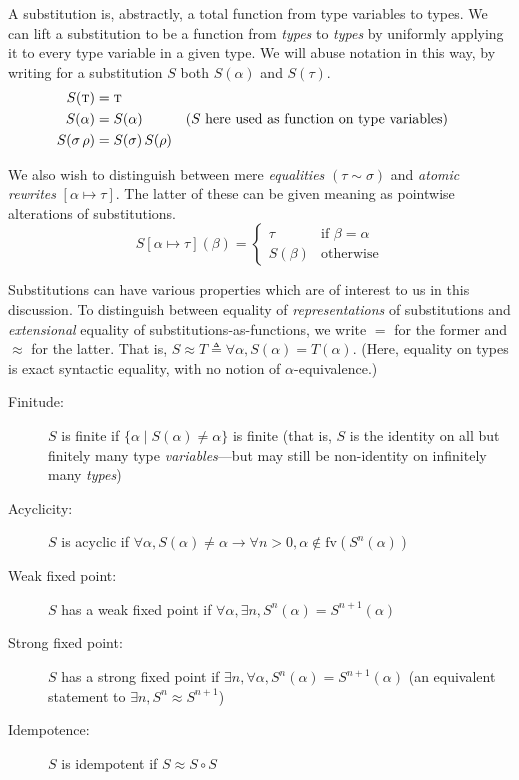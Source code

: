 \documentclass[10pt, letterpaper, oneside]{article}
\newcommand{\fv}{\mathrm{fv}}
\begin{document}
A substitution is, abstractly, a total function from type variables to types. We can lift a substitution to be a function from \emph{types} to \emph{types} by uniformly applying it to every type variable in a given type. We will abuse notation in this way, by writing for a substitution \(S\) both \(S(\alpha)\) and \(S(\tau)\).
\begin{align*}
  S(\text{\sc t}) &= \text{\sc t}\\
  S(\alpha)       &= S(\alpha) && \text{(\(S\) here used as function on type variables)}\\
  S(\sigma\,\rho) &= S(\sigma)\,S(\rho)
\end{align*}

We also wish to distinguish between mere \emph{equalities} \((\tau \sim \sigma)\) and \emph{atomic rewrites} \([\alpha \mapsto \tau]\). The latter of these can be given meaning as pointwise alterations of substitutions.
\begin{equation*}
  S[\alpha \mapsto \tau](\beta) =
  \begin{cases}
    \tau & \text{if } \beta = \alpha\\
    S(\beta) & \text{otherwise}
  \end{cases}
\end{equation*}

Substitutions can have various properties which are of interest to us in this discussion. To distinguish between equality of \emph{representations} of substitutions and \emph{extensional} equality of substitutions-as-functions, we write \(=\) for the former and \(\approx\) for the latter. That is, \(S \approx T \triangleq \forall \alpha, S(\alpha) = T(\alpha)\). (Here, equality on types is exact syntactic equality, with no notion of \(\alpha\)-equivalence.)

\begin{description}
\item[Finitude:] \(S\) is finite if \(\{\alpha \mid S(\alpha) \ne \alpha\}\) is finite (that is, \(S\) is the identity on all but finitely many type \emph{variables}---but may still be non-identity on infinitely many \emph{types})
\item[Acyclicity:] \(S\) is acyclic if \(\forall \alpha, S(\alpha) \ne \alpha \to \forall n > 0, \alpha \notin \fv(S^n(\alpha))\)
\item[Weak fixed point:] \(S\) has a weak fixed point if \(\forall \alpha, \exists n, S^n(\alpha) = S^{n + 1}(\alpha)\)
\item[Strong fixed point:] \(S\) has a strong fixed point if \(\exists n, \forall \alpha, S^n(\alpha) = S^{n + 1}(\alpha)\) (an equivalent statement to \(\exists n, S^n \approx S^{n + 1}\))
\item[Idempotence:] \(S\) is idempotent if \(S \approx S \circ S\)
\end{description}
\end{document}
